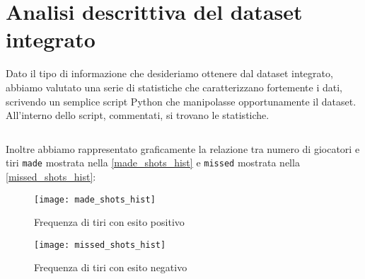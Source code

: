 \section{Analisi descrittiva del dataset integrato}

Dato il tipo di informazione che desideriamo ottenere dal dataset integrato, abbiamo valutato una serie di statistiche che caratterizzano fortemente i dati, scrivendo un semplice script Python che manipolasse opportunamente il dataset. All'interno dello script, commentati, si trovano le statistiche.

\begin{code}
\inputminted[breaklines]{python}{../dataintegration/count.py}
\end{code}

Inoltre abbiamo rappresentato graficamente la relazione tra numero di giocatori e tiri \texttt{made} mostrata nella \autoref{made_shots_hist} e \texttt{missed} mostrata nella \autoref{missed_shots_hist}:

\begin{figure}
\caption{Frequenza di tiri con esito positivo}
\label{made_shots_hist}
\texttt{[image: made\_shots\_hist]}
\end{figure}

\begin{figure}
\caption{Frequenza di tiri con esito negativo}
\label{missed_shots_hist}
\texttt{[image: missed\_shots\_hist]}
\end{figure}
